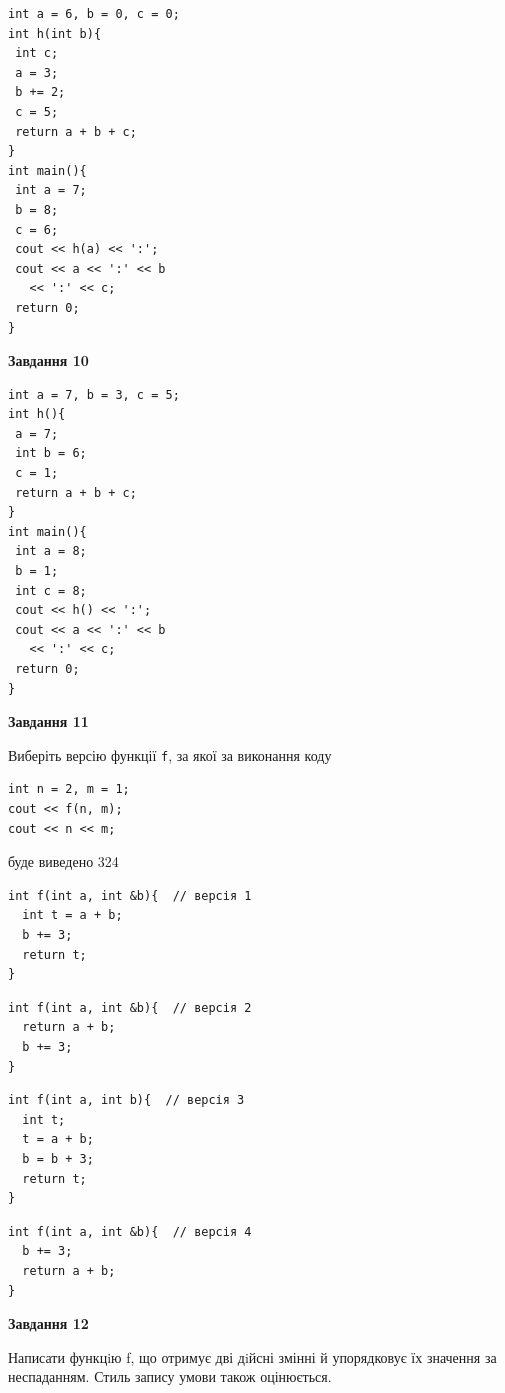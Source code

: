 \documentclass[12pt, ukrainian]{article}
\def\code#1{\Verb!#1!}
\begin{document}
{\begin {large}
\begin{minipage}[t]{7.0cm}
\begin{verbatim}
int a = 6, b = 0, c = 0;
int h(int b){
 int c;
 a = 3;
 b += 2;
 c = 5;
 return a + b + c;
}
int main(){
 int a = 7;
 b = 8;
 c = 6;
 cout << h(a) << ':';
 cout << a << ':' << b 
   << ':' << c;
 return 0;
}
\end{verbatim}



\begin{center}
\textbf{Завдання 10}
\end{center}
\vspace{-8mm}

\begin{verbatim}
int a = 7, b = 3, c = 5;
int h(){
 a = 7;
 int b = 6;
 c = 1;
 return a + b + c;
}
int main(){
 int a = 8;
 b = 1;
 int c = 8;
 cout << h() << ':';
 cout << a << ':' << b 
   << ':' << c;
 return 0;
}
\end{verbatim}

\end{minipage}
\vline \hspace{1mm}
\begin{minipage}[t]{11.0cm}

\begin{center}
\textbf{Завдання 11}
\end{center}
Виберіть версію функції \code{f}, за якої за виконання коду
\begin{verbatim}
int n = 2, m = 1;
cout << f(n, m);
cout << n << m;
\end{verbatim}

буде виведено 324

\begin{verbatim}
int f(int a, int &b){  // версія 1
  int t = a + b;
  b += 3;
  return t;
}
\end{verbatim}

\vspace{-8mm}\begin{verbatim}
int f(int a, int &b){  // версія 2
  return a + b;
  b += 3;
}
\end{verbatim}

\vspace{-8mm}\begin{verbatim}
int f(int a, int b){  // версія 3
  int t;
  t = a + b;
  b = b + 3;
  return t;
}
\end{verbatim}

\vspace{-8mm}\begin{verbatim}
int f(int a, int &b){  // версія 4
  b += 3;
  return a + b;
}
\end{verbatim}



\begin{center}
\textbf{Завдання 12}
\end{center}

Написати функцiю f, що отримує дві дiйсні змінні й упорядковує їх значення за неспаданням. Стиль запису умови також оцінюється.\par

\end{minipage}

\end {large}}
\newpage
\end{document}
